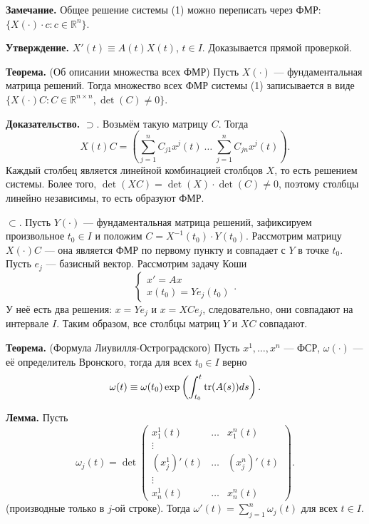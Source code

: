 \textbf{Замечание.} Общее решение системы (1) можно переписать через ФМР: $\{X(\cdot) \cdot c: c \in \mathbb R^n\}$.

\textbf{Утверждение.} $X'(t) \equiv A(t) X(t)$, $t \in I$. Доказывается прямой проверкой.

\textbf{Теорема.} (Об описании множества всех ФМР) Пусть $X(\cdot)$ --- фундаментальная матрица решений.
Тогда множество всех ФМР системы (1) записывается в виде $\{X(\cdot) C: C \in \mathbb R^{n \times n}, \det(C) \ne 0\}$.

\textbf{Доказательство.} $\supset$. Возьмём такую матрицу $C$. Тогда
\[
    X(t) C = \left(\sum_{j=1}^{n} C_{j1} x^j(t)~\dots~\sum_{j=1}^{n} C_{jn}x^j(t) \right).
\]
Каждый столбец является линейной комбинацией столбцов $X$, то есть решением системы.
Более того, $\det(XC) = \det(X) \cdot \det(C) \ne 0$, поэтому столбцы линейно независимы, то есть образуют ФМР.

$\subset$. Пусть $Y(\cdot)$ --- фундаментальная матрица решений, зафиксируем произвольное $t_0 \in I$ и положим $C = X^{-1}(t_0) \cdot Y(t_0)$.
Рассмотрим матрицу $X(\cdot) C$ --- она является ФМР по первому пункту и совпадает с $Y$ в точке $t_0$.
Пусть $e_j$ --- базисный вектор.
Рассмотрим задачу Коши
\[
    \begin{cases}
        x' = Ax \\
        x(t_0) = Y e_j (t_0)
    \end{cases} .
\]
У неё есть два решения: $x = Y e_j$ и $x = XC e_j$, следовательно, они совпадают на интервале $I$.
Таким образом, все столбцы матриц $Y$ и $XC$ совпадают.

\QED

\textbf{Теорема.} (Формула Лиувилля-Остроградского) Пусть $x^1, \dots, x^n$ --- ФСР, $\omega(\cdot)$ --- её определитель Вронского, тогда для всех $t_0 \in I$ верно
\[
    \omega(t) \equiv \omega(t_0) \exp \left( \int_{t_0}^{t} \operatorname{tr}(A(s)) ds \right).
\]

\textbf{Лемма.} Пусть
\[
    \omega_j(t) = \det
    \begin{pmatrix}
        x_1^1(t) & \dots & x_1^n(t) \\
        \vdots \\
        (x^1_j)'(t) & \dots & (x^n_j)'(t) \\
        \vdots \\
        x_n^1(t) & \dots & x_n^n(t)
    \end{pmatrix} .
\]
(производные только в $j$-ой строке). Тогда $\omega'(t) = \sum_{j=1}^{n} \omega_j(t)$ для всех $t \in I$.

